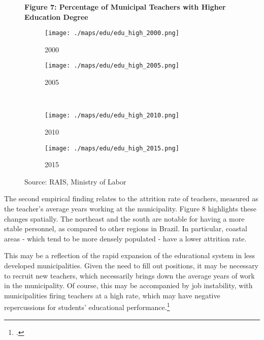 \documentclass[12pt,]{book}
\let\rmarkdownfootnote\footnote%
\def\footnote{\protect\rmarkdownfootnote}
\begin{document}
\begin{figure}
    \centering
    \textbf{Figure 7: Percentage of Municipal Teachers with Higher Education Degree}
     \begin{subfigure}{0.4\textwidth}
        \centering 
        \texttt{[image: ./maps/edu/edu\_high\_2000.png]}
        \caption{2000}
    \end{subfigure} %
    \begin{subfigure}{0.4\textwidth}
        \centering
        \texttt{[image: ./maps/edu/edu\_high\_2005.png]}
        \caption{2005}
    \end{subfigure} \\
    \begin{subfigure}{0.4\textwidth}
        \centering
        \texttt{[image: ./maps/edu/edu\_high\_2010.png]}
        \caption{2010}
    \end{subfigure} %
    \begin{subfigure}{0.4\textwidth}
        \centering
        \texttt{[image: ./maps/edu/edu\_high\_2015.png]}
        \caption{2015}
    \end{subfigure}
    \caption*{\footnotesize \hfill Source: RAIS, Ministry of Labor}
\end{figure}

The second empirical finding relates to the attrition rate of teachers, measured as the teacher's average years working at the municipality. Figure 8 highlights these changes spatially. The northeast and the south are notable for having a more stable personnel, as compared to other regions in Brazil. In particular, coastal areas - which tend to be more densely populated - have a lower attrition rate.

This may be a reflection of the rapid expansion of the educational system in less developed municipalities. Given the need to fill out positions, it may be necessary to recruit new teachers, which necessarily brings down the average years of work in the municipality. Of course, this may be accompanied by job instability, with municipalities firing teachers at a high rate, which may have negative repercussions for students' educational performance.\footnote{\citet{stinebrickner_empirical_1998}.}
\end{document}
